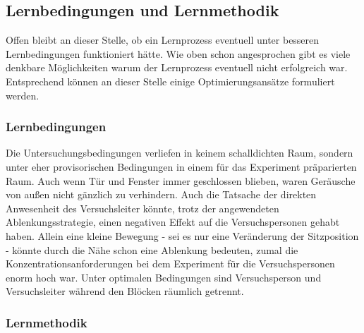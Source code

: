 \documentclass[doc,a4paper,12pt]{apa6}
\begin{document}
\subsection{Lernbedingungen und Lernmethodik}

Offen bleibt an dieser Stelle, ob ein Lernprozess eventuell unter besseren Lernbedingungen funktioniert hätte. Wie oben schon angesprochen gibt es viele denkbare Möglichkeiten warum der Lernprozess eventuell nicht erfolgreich war. Entsprechend können an dieser Stelle einige Optimierungsansätze formuliert werden.

\subsubsection{Lernbedingungen}

Die Untersuchungsbedingungen verliefen in keinem schalldichten Raum, sondern unter eher provisorischen Bedingungen in einem für das Experiment präparierten Raum. Auch wenn Tür und Fenster immer geschlossen blieben, waren Geräusche von außen nicht gänzlich zu verhindern. Auch die Tatsache der direkten Anwesenheit des Versuchsleiter könnte, trotz der angewendeten Ablenkungsstrategie, einen negativen Effekt auf die Versuchspersonen gehabt haben. Allein eine kleine Bewegung - sei es nur eine Veränderung der Sitzposition - könnte durch die Nähe schon eine Ablenkung bedeuten, zumal die Konzentrationsanforderungen bei dem Experiment für die Versuchspersonen enorm hoch war. Unter optimalen Bedingungen sind Versuchsperson und Versuchsleiter während den Blöcken räumlich getrennt.

\subsubsection{Lernmethodik}
\end{document}
